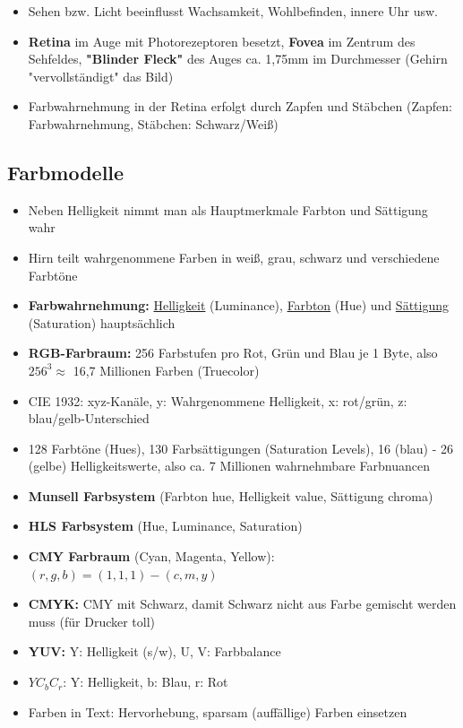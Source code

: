 \documentclass[12pt,landscape]{article}
\begin{document}
\begin{multicols}{3}
\begin{itemize}
\item Sehen bzw. Licht beeinflusst Wachsamkeit, Wohlbefinden, innere Uhr usw.
\item \textbf{Retina} im Auge mit Photorezeptoren besetzt, \textbf{Fovea} im Zentrum des Sehfeldes, \textbf{"Blinder Fleck"} des Auges ca. 1,75mm im Durchmesser (Gehirn "vervollständigt" das Bild)
\item Farbwahrnehmung in der Retina erfolgt durch Zapfen und Stäbchen (Zapfen: Farbwahrnehmung, Stäbchen: Schwarz/Weiß)
\end{itemize}
\subsection{Farbmodelle}
\begin{itemize}
\item Neben Helligkeit nimmt man als Hauptmerkmale Farbton und Sättigung wahr
\item Hirn teilt wahrgenommene Farben in weiß, grau, schwarz und verschiedene Farbtöne
\item \textbf{Farbwahrnehmung:} \underline{Helligkeit} (Luminance), \underline{Farbton} (Hue) und \underline{Sättigung} (Saturation) hauptsächlich
\item \textbf{RGB-Farbraum:} 256 Farbstufen pro Rot, Grün und Blau je 1 Byte, also $256^3 \approx$ 16,7 Millionen Farben (Truecolor)
\item CIE 1932: xyz-Kanäle, y: Wahrgenommene Helligkeit, x: rot/grün, z: blau/gelb-Unterschied
\item 128 Farbtöne (Hues), 130 Farbsättigungen (Saturation Levels), 16 (blau) - 26 (gelbe) Helligkeitswerte, also ca. 7 Millionen wahrnehmbare Farbnuancen
\item \textbf{Munsell Farbsystem} (Farbton hue, Helligkeit value, Sättigung chroma)
\item \textbf{HLS Farbsystem} (Hue, Luminance, Saturation)
\item \textbf{CMY Farbraum} (Cyan, Magenta, Yellow): $(r, g, b) = (1, 1, 1) - (c, m, y)$
\item \textbf{CMYK:} CMY mit Schwarz, damit Schwarz nicht aus Farbe gemischt werden muss (für Drucker toll)
\item \textbf{YUV:} Y: Helligkeit (s/w), U, V: Farbbalance
\item $YC_bC_r$: Y: Helligkeit, b: Blau, r: Rot
\item Farben in Text: Hervorhebung, sparsam (auffällige) Farben einsetzen

\end{itemize}
\end{multicols}
\end{document}
